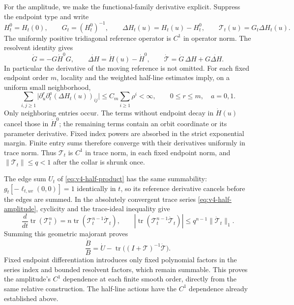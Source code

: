 For the amplitude, we make the functional-family derivative explicit.
Suppress the endpoint type and write
\[
 H_t^0=H_t(0),\qquad G_t=(H_t^0)^{-1},\qquad
 \Delta H_t(u)=H_t(u)-H_t^0,\qquad
 \mathcal T_t(u)=G_t\Delta H_t(u).
\]
The uniformly positive tridiagonal reference operator is $C^1$ in
operator norm.  The resolvent identity gives
\begin{equation}\label{eq:v49-moving-reference}
 \dot G=-G\dot H^0G,\qquad
 \dot{\Delta H}=\dot H(u)-\dot H^0,\qquad
 \dot{\mathcal T}=\dot G\,\Delta H+G\dot{\Delta H}.
\end{equation}
In particular the derivative of the moving reference is not omitted.
For each fixed endpoint order $m$, locality and the weighted half-line
estimates imply, on a uniform small neighborhood,
\[
 \sum_{i,j\ge1}\bigl|
       \partial_u^r\partial_t^a(\Delta H_t(u))_{ij}\bigr|
       \le C_m\sum_{i\ge1}\rho^i<\infty,
          \qquad 0\le r\le m,\quad a=0,1.
\]
Only neighboring entries occur.  The terms without endpoint decay in
$\dot H(u)$ cancel those in $\dot H^0$; the remaining terms contain
an orbit coordinate or its parameter derivative.  Fixed index powers
are absorbed in the strict exponential margin.  Finite entry sums
therefore converge with their derivatives uniformly in trace norm.
Thus $\mathcal T_t$ is $C^1$ in trace norm, in each fixed endpoint norm,
and $\|\mathcal T_t\|\le q<1$ after the collar is shrunk once.

The edge sum $U_t$ of \eqref{eq:v4-half-product} has the same
summability: $g_t[-\ell_{t,uv}(0,0)]=1$ identically in $t$, so its
reference derivative cancels before the edges are summed.  In the
absolutely convergent trace series \eqref{eq:v4-half-amplitude},
cyclicity and the trace-ideal inequality give
\[
 \frac{d}{dt}\operatorname{tr}(\mathcal T_t^n)
    =n\operatorname{tr}(\mathcal T_t^{n-1}\dot{\mathcal T}_t),
 \qquad
 |\operatorname{tr}(\mathcal T_t^{n-1}\dot{\mathcal T}_t)|
     \le q^{n-1}\|\dot{\mathcal T}_t\|_1.
\]
Summing this geometric majorant proves
\begin{equation}\label{eq:v49-amplitude-derivative}
 \frac{\dot B}{B}=\dot U-
       \operatorname{tr}\bigl((I+\mathcal T)^{-1}
                                      \dot{\mathcal T}\bigr).
\end{equation}
Fixed endpoint differentiation introduces only fixed polynomial factors
in the series index and bounded resolvent factors, which remain
summable.  This proves the amplitude's $C^1$ dependence at each finite
smooth order, directly from the same relative construction.  The
half-line actions have the $C^1$ dependence already established above.
